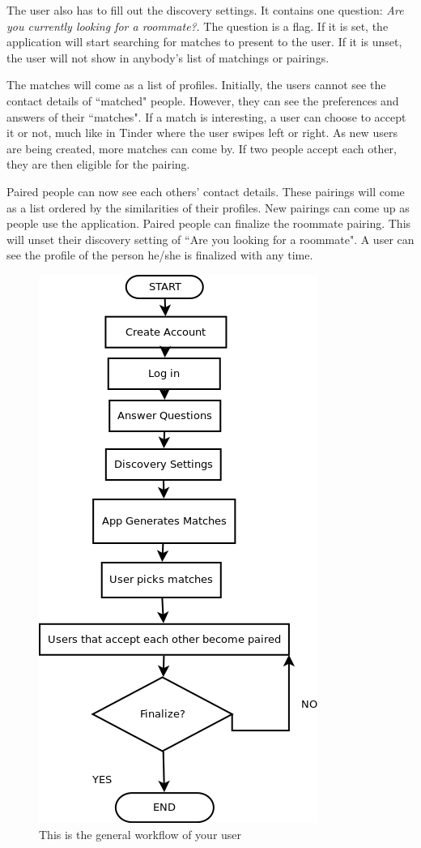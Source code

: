 \documentclass[journal]{IEEEtran}
\begin{document}
The user also has to fill out the discovery settings. It contains one question: \textit{Are you currently looking for a
roommate?}. The question is a flag. If it is set, the application will start searching for matches to present to the
user. If it is unset, the user will not show in anybody's list of matchings or pairings.

The matches will come as a list of profiles. Initially, the users cannot see the contact details of ``matched" people.
However, they can see the preferences and answers of their ``matches". If a match is interesting, a user can choose to
accept it or not, much like in Tinder where the user swipes left or right. As new users are being created, more matches
can come by. If two people accept each other, they are then eligible for the pairing.

Paired people can now see each others' contact details. These pairings will come as a list ordered by the similarities
of their profiles. New pairings can come up as people use the application.  Paired people can finalize the roommate
pairing. This will unset their discovery setting of ``Are you looking for a roommate". A user can see the profile of the
person he/she is finalized with any time.

\begin{figure}[h]
\centering
\includegraphics[scale=0.5]{Workflow}
\caption{This is the general workflow of your user}
\end{figure}
\end{document}
